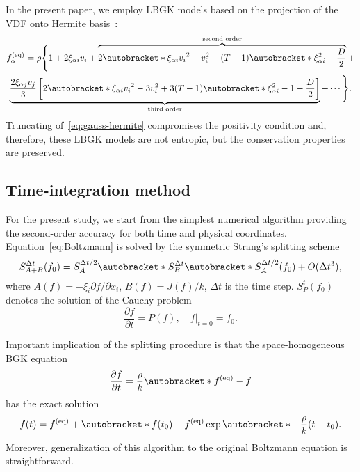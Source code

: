 \documentclass{article}
\newcommand{\pder}[2][]{\frac{\partial#1}{\partial#2}}
\newcommand{\Pder}[2][]{\partial#1/\partial#2}
\newcommand{\OO}[1]{O(#1)}
\DeclarePairedDelimiter\autobracket()       %
\newcommand{\br}[1]{\autobracket*{#1}}
\newcommand{\xiai}{\xi_{\alpha i}}
\newcommand{\xiaj}{\xi_{\alpha j}}
\newcommand{\equil}[1]{#1^\mathrm{(eq)}}
\begin{document}
In the present paper, we employ LBGK models based on the projection of the VDF onto Hermite basis~\cite{Shan2006}:
\begin{multline}\label{eq:gauss-hermite}
    \equil{f}_\alpha = \rho\Bigg\{ 1 + 2\xiai v_i + \overbrace{
        2\br{\xiai v_i}^2 - v_i^2 + (T-1)\br{\xiai^2 - \frac{D}2}
    }^\text{second order} + \\ \underbrace{
        \frac{2\xiaj v_j}3\left[ 2\br{\xiai v_i}^2 - 3v_i^2 + 3(T-1)\br{\xiai^2 - 1 - \frac{D}2}\right]
    }_\text{third order} + \cdots \Bigg\}.
\end{multline}
Truncating of~\eqref{eq:gauss-hermite} compromises the positivity condition and,
therefore, these LBGK models are not entropic, but the conservation properties are preserved.

\subsection{Time-integration method}\label{sec:splitting}

For the present study, we start from the simplest numerical algorithm providing the second-order accuracy
for both time and physical coordinates.
Equation~\eqref{eq:Boltzmann} is solved by the symmetric Strang's splitting scheme~\cite{Bobylev2001}
\begin{equation}\label{eq:Strang}
    S^{\Delta{t}}_{A+B}(f_0) = S^{\Delta{t}/2}_A \br{S^{\Delta{t}}_B \br{S^{\Delta{t}/2}_A(f_0)} } + \OO{\Delta{t}^3},
\end{equation}
where \(A(f) = -\xi_i\Pder[f]{x_i}\), \(B(f) = J(f)/k\), \(\Delta{t}\) is the time step.
\(S^t_P (f_0)\) denotes the solution of the Cauchy problem
\begin{equation}\label{eq:Cauchy}
    \pder[f]{t} = P(f), \quad f|_{t=0} = f_0.
\end{equation}

Important implication of the splitting procedure is that the space-homogeneous BGK equation
\begin{equation}\label{eq:bgk_homogeneous}
    \pder[f]{t} = \frac{\rho}k \br{\equil{f}-f}
\end{equation}
has the exact solution
\begin{equation}\label{eq:bgk_exact}
    f(t) = \equil{f} + \br{f(t_0)-\equil{f}}\exp\br{-\frac{\rho}k (t-t_0)}.
\end{equation}
Moreover, generalization of this algorithm to the original Boltzmann equation is straightforward.
\end{document}
